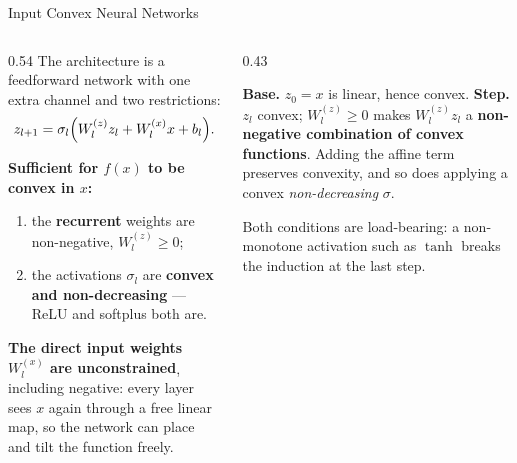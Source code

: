 \begin{frame}{Input Convex Neural Networks}
\begin{columns}[T]
\begin{column}{0.54\textwidth}
\small
The architecture is a feedforward network with one extra channel and two restrictions:
\[
  z_{l+1}=\sigma_l\Bigl(W^{(z)}_{l}z_l+W^{(x)}_{l}x+b_l\Bigr).
\]
\medskip

\textbf{Sufficient for $f(x)$ to be convex in $x$:}
\begin{enumerate}\small\setlength{\itemsep}{0.7mm}
  \item the \textbf{recurrent} weights are non-negative, $W^{(z)}_l\ge0$;
  \item the activations $\sigma_l$ are \textbf{convex and non-decreasing} --- ReLU and softplus both are.
\end{enumerate}
\medskip

\textbf{The direct input weights $W^{(x)}_l$ are unconstrained}, including negative: every layer sees $x$ again through a free linear map, so the network can place and tilt the function freely.
\end{column}
\begin{column}{0.43\textwidth}
\begin{conceptbox}[title=\textbf{The proof, by induction}]\small
\textbf{Base.} $z_0=x$ is linear, hence convex.
\medskip
\textbf{Step.} $z_l$ convex; $W^{(z)}_l\ge0$ makes $W^{(z)}_lz_l$ a \textbf{non-negative combination of convex functions}. Adding the affine term preserves convexity, and so does applying a convex \emph{non-decreasing} $\sigma$.
\end{conceptbox}
\medskip
{\footnotesize Both conditions are load-bearing: a non-monotone activation such as $\tanh$ breaks the induction at the last step.}
\end{column}
\end{columns}
\vspace{1mm}
\end{frame}

